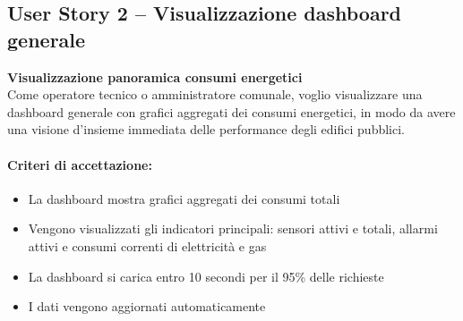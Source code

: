 \subsection{User Story 2 – Visualizzazione dashboard generale}
\label{us:dashboardGenerale}

\textbf{Visualizzazione panoramica consumi energetici} \\
Come operatore tecnico o amministratore comunale, voglio visualizzare una dashboard generale con grafici aggregati dei consumi energetici, in modo da avere una visione d'insieme immediata delle performance degli edifici pubblici.

\paragraph*{Criteri di accettazione:}
\begin{itemize}
    \item La dashboard mostra grafici aggregati dei consumi totali
    \item Vengono visualizzati gli indicatori principali: sensori attivi e totali, allarmi attivi e consumi correnti di elettricità e gas
    \item La dashboard si carica entro 10 secondi per il 95\% delle richieste
    \item I dati vengono aggiornati automaticamente
\end{itemize}

